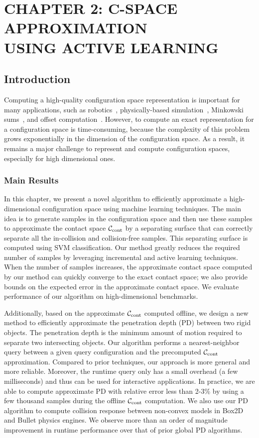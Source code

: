 \chapter[C-SPACE APPROXIMATION USING ACTIVE LEARNING]
{CHAPTER 2: C-SPACE APPROXIMATION \\ USING ACTIVE LEARNING}
\label{chp:APD}

\section{Introduction}
\label{sec:2:intro}
Computing a high-quality configuration space representation is important for many applications, such as robotics~\cite{LPT:SpatialPlanning:1983}, physically-based simulation~\cite{Je:2012:PRP}, Minkowski sums~\cite{Varadhan:2006:TPA}, and offset computation~\cite{Choi:1997:CAD}. 
However, to compute an exact representation for a configuration space is time-consuming, because the complexity of this problem grows exponentially in the dimension of the configuration space. As a result, it remains a major challenge to represent and compute configuration spaces, especially for high dimensional ones.

\subsection{Main Results}
In this chapter, we present a novel algorithm to efficiently approximate a high-dimensional configuration space using machine learning techniques. The main idea is to generate samples in the configuration space and then use these samples to approximate the contact space $\mathcal C_\text{cont}$ by a separating surface that can correctly separate all the in-collision and collision-free samples. This separating surface is computed using SVM classification. Our method greatly reduces the required number of samples by leveraging incremental and active learning techniques. 
When the number of samples increases, the approximate contact space computed by our method can quickly converge to the exact contact space; we also provide bounds on the expected error in the approximate contact space. We evaluate performance of our algorithm on high-dimensional benchmarks.

Additionally, based on the approximate $\mathcal C_\text{cont}$ computed offline, we design a new method to efficiently approximate the penetration depth (PD) between two rigid objects. The penetration depth is the minimum amount of motion required to separate two intersecting objects. Our algorithm performs a nearest-neighbor query between a given query configuration and the precomputed $\mathcal C_\text{cont}$ approximation. Compared to prior techniques, our approach is more general and more reliable. Moreover, the runtime query only has a small overhead (a few milliseconds) and thus can be used for interactive applications. In practice, we are able to compute approximate PD with relative error less than 2-3\% by using a few thousand samples during the offline $\mathcal C_\text{cont}$ computation. We also use our PD algorithm to compute collision response between non-convex models in Box2D and Bullet physics engines. We observe more than an order of magnitude improvement in runtime performance over that of prior global PD algorithms.


